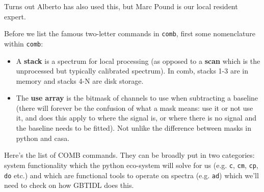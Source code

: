 \documentclass[12pt,a4paper]{article}
\begin{document}
Turns out Alberto has also used this, but Marc Pound is our local resident expert.

Before we list the famous two-letter commands in {\tt comb}, first some nomenclature within {\tt comb}:

\begin{itemize}
  
\item A {\bf stack} is a spectrum for local processing (as opposed to a
  {\bf scan} which is the unprocessed but typically calibrated spectrum).
  In comb, stacks 1-3 are in memory and stacks 4-N are disk storage.
  
\item  
  The {\bf use array} is the bitmask of channels to use when subtracting a
  baseline (there will forever be the confusion of what a mask means: use it
  or not use it, and does this apply to where the signal is, or where there
  is no signal and the baseline needs to be fitted). Not unlike the difference
  between masks in python and casa.
  
\end{itemize}

Here's the list of COMB commands.  They can be broadly put in two categories:
system functionality which the python eco-system will solve for us (e.g. {\tt c},
{\tt cm}, {\tt cp}, {\tt do} etc.) and which are functional tools to operate
on spectra (e.g. {\tt ad}) which we'll need to check on how GBTIDL does this.
\end{document}
